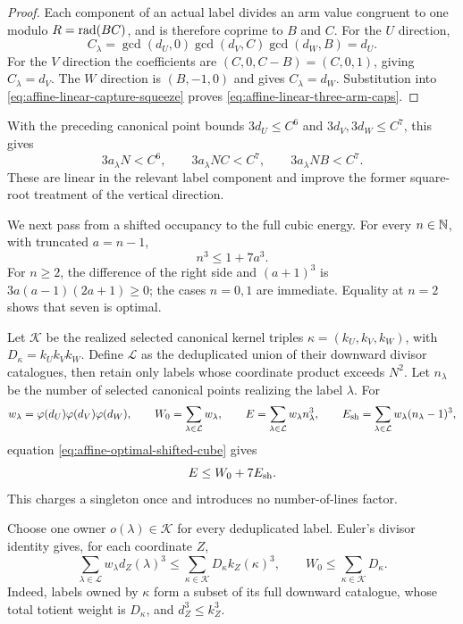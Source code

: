 \begin{proof}
Each component of an actual label divides an arm value congruent to one
modulo $R=\operatorname{rad}(BC)$, and is therefore coprime to $B$ and $C$.
For the $U$ direction,
\[
 C_\lambda
 =\gcd(d_U,0)\gcd(d_V,C)\gcd(d_W,B)
 =d_U.
\]
For the $V$ direction the coefficients are $(C,0,C-B)=(C,0,1)$, giving
\(C_\lambda=d_V\).  The $W$ direction is $(B,-1,0)$ and gives
\(C_\lambda=d_W\).  Substitution into
\eqref{eq:affine-linear-capture-squeeze} proves
\eqref{eq:affine-linear-three-arm-caps}.
\end{proof}

With the preceding canonical point bounds
$3d_U\le C^6$ and $3d_V,3d_W\le C^7$, this gives
\[
 3a_\lambda N<C^6,\qquad
 3a_\lambda NC<C^7,\qquad
 3a_\lambda NB<C^7.
\]
These are linear in the relevant label component and improve the former
square-root treatment of the vertical direction.

We next pass from a shifted occupancy to the full cubic energy.  For every
$n\in\mathbb N$, with truncated $a=n-1$,
\begin{equation}\label{eq:affine-optimal-shifted-cube}
                         n^3\le1+7a^3.
\end{equation}
For $n\ge2$, the difference of the right side and $(a+1)^3$ is
$3a(a-1)(2a+1)\ge0$; the cases $n=0,1$ are immediate.  Equality at $n=2$
shows that seven is optimal.

Let $\mathcal K$ be the realized selected canonical kernel triples
$\kappa=(k_U,k_V,k_W)$, with $D_\kappa=k_Uk_Vk_W$.  Define
$\mathcal L$ as the deduplicated union of their downward divisor catalogues,
then retain only labels whose coordinate product exceeds $N^2$.  Let
$n_\lambda$ be the number of selected canonical points realizing the label
$\lambda$.  For
\[
 w_\lambda=\varphi(d_U)\varphi(d_V)\varphi(d_W),\qquad
 W_0=\sum_{\lambda\in\mathcal L}w_\lambda,\qquad
 E=\sum_{\lambda\in\mathcal L}w_\lambda n_\lambda^3,\qquad
 E_{\rm sh}=\sum_{\lambda\in\mathcal L}w_\lambda(n_\lambda-1)^3,
\]
equation \eqref{eq:affine-optimal-shifted-cube} gives
\begin{equation}\label{eq:affine-global-shifted-bridge}
                         E\le W_0+7E_{\rm sh}.
\end{equation}
This charges a singleton once and introduces no number-of-lines factor.

Choose one owner $o(\lambda)\in\mathcal K$ for every deduplicated label.
Euler's divisor identity gives, for each coordinate $Z$,
\begin{equation}\label{eq:affine-owner-third-moment}
 \sum_{\lambda\in\mathcal L}w_\lambda d_Z(\lambda)^3
 \le\sum_{\kappa\in\mathcal K}D_\kappa k_Z(\kappa)^3,
 \qquad
 W_0\le\sum_{\kappa\in\mathcal K}D_\kappa.
\end{equation}
Indeed, labels owned by $\kappa$ form a subset of its full downward
catalogue, whose total totient weight is $D_\kappa$, and
$d_Z^3\le k_Z^3$.

